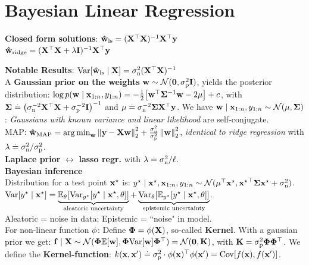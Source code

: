 \section{Bayesian Linear Regression}
\begin{framed}
    \textbf{Closed form solutions}:
    $\vwhat_{\ls} = \inv{(\transpose{\mX} \mX)} \transpose{\mX} \vy$  \\
    $\vwhat_{\ridge} = \inv{(\transpose{\mX} \mX + \lambda \mI)} \transpose{\mX} \vy$
\end{framed}
\textbf{Notable Results}: $\Var{\vwhat_{\ls} \mid \rX} = \sigman^2(\transpose{\rX}\rX)^{-1}$ \\
A \textbf{Gaussian prior on the weights} $\vw \sim \N{\vzero}{\sigmap^2 \mI}$, yields the posterior distribution: $\log p(\vw \mid \vx_{1:n}, y_{1:n}) = -\frac{1}{2} \brackets*{\transpose{\vw}\mSigma^{-1}\vw - 2\vmu} + c$,
with $\mSigma \defeq \inv{\parentheses*{\sigman^{-2} \transpose{\mX} \mX + \sigmap^{-2} \mI}}$ and $\vmu \defeq \sigman^{-2} \mSigma \transpose{\mX} \vy$. 
We have $\vw \mid \vx_{1:n}, y_{1:n} \sim \N{\vmu}{\mSigma}$: \textit{Gaussians with known variance and linear likelihood} are self-conjugate. \\
MAP: $\vwhat_\MAP = \argmin_\vw \norm{\vy - \mX \vw}_2^2 + \frac{\sigman^2}{\sigmap^2} \norm{\vw}_2^2$, \textit{identical to ridge regression} with $\lambda \defeq \sigman^2 / \sigmap^2$. \\
\textbf{Laplace prior} $\leftrightarrow$ \textbf{lasso regr.} with ${\lambda \defeq \sigman^2 / \ell}$. \\
\textbf{Bayesian inference} \\
Distribution for a test point $\vxs$ is: $\ys \mid \vxs, \vx_{1:n}, y_{1:n} \sim \N{\transpose{\vmu} \vxs}{\transpose{\vxs} \mSigma \vxs + \sigman^2}$. \\
$\Var{\ys \mid \vxs} = \underbrace{\E[\vtheta]{\Var[\ys]{\ys \mid \vxs, \vtheta}}}_{\text{aleatoric uncertainty}} + \underbrace{\Var[\vtheta]{\E[\ys]{\ys \mid \vxs, \vtheta}}}_{\text{epistemic uncertainty}}$.\\
Aleatoric = noise in data; Epistemic = ``noise" in model. \\
For non-linear function $\vphi$: Define $\mPhi = \vphi(\rX)$, so-called \textbf{Kernel}. With a gaussian prior we get: $\vf \mid \mX \sim \N{\mPhi \E{\vw}}{\mPhi \Var{\vw} \transpose{\mPhi}} = \N{\vzero}{\mK}$, with $\mK = \sigmap^2 \mPhi \transpose{\mPhi}$. We define the \textbf{Kernel-function}: $k(\vx, \vxp) \defeq \sigmap^2 \cdot \transpose{\vphi(\vx)} \vphi(\vxp) = \Cov{f(\vx), f(\vxp)}$.
